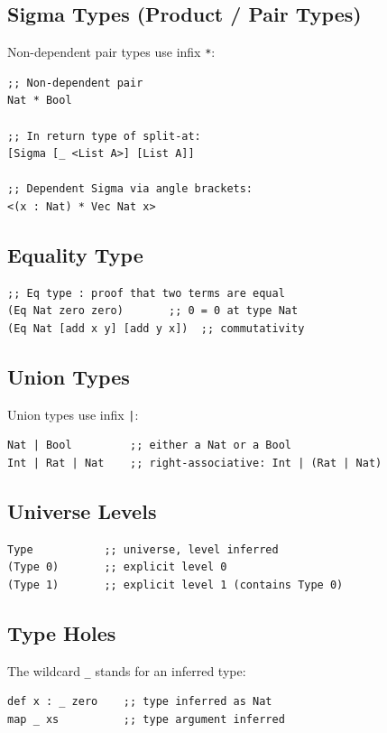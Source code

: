 \documentclass[11pt]{article}
\begin{document}
\subsection{Sigma Types (Product / Pair Types)}
\label{sec:orgbdd2aa4}

Non-dependent pair types use infix \texttt{*}:

\begin{verbatim}
;; Non-dependent pair
Nat * Bool

;; In return type of split-at:
[Sigma [_ <List A>] [List A]]

;; Dependent Sigma via angle brackets:
<(x : Nat) * Vec Nat x>
\end{verbatim}
\subsection{Equality Type}
\label{sec:orgc865f24}

\begin{verbatim}
;; Eq type : proof that two terms are equal
(Eq Nat zero zero)       ;; 0 = 0 at type Nat
(Eq Nat [add x y] [add y x])  ;; commutativity
\end{verbatim}
\subsection{Union Types}
\label{sec:orga8b0290}

Union types use infix \texttt{|}:

\begin{verbatim}
Nat | Bool         ;; either a Nat or a Bool
Int | Rat | Nat    ;; right-associative: Int | (Rat | Nat)
\end{verbatim}
\subsection{Universe Levels}
\label{sec:org4dbafa4}

\begin{verbatim}
Type           ;; universe, level inferred
(Type 0)       ;; explicit level 0
(Type 1)       ;; explicit level 1 (contains Type 0)
\end{verbatim}
\subsection{Type Holes}
\label{sec:orge7bfb98}

The wildcard \texttt{\_} stands for an inferred type:

\begin{verbatim}
def x : _ zero    ;; type inferred as Nat
map _ xs          ;; type argument inferred
\end{verbatim}
\end{document}
